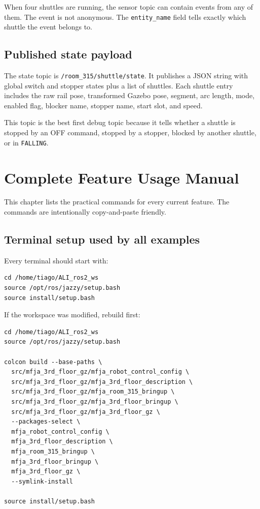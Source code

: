 \documentclass[12pt,a4paper]{report}
\newcommand{\codenext}[1]{\par\Needspace{#1\baselineskip}}
\begin{document}
When four shuttles are running, the sensor topic can contain events from any of
them. The event is not anonymous. The \texttt{entity\_name} field tells exactly
which shuttle the event belongs to.

\section{Published state payload}

The state topic is \texttt{/room\_315/shuttle/state}. It publishes a JSON string
with global switch and stopper states plus a list of shuttles. Each shuttle
entry includes the raw rail pose, transformed Gazebo pose, segment, arc length,
mode, enabled flag, blocker name, stopper name, start slot, and speed.

\codenext{28}


This topic is the best first debug topic because it tells whether a shuttle is
stopped by an OFF command, stopped by a stopper, blocked by another shuttle, or
in \texttt{FALLING}.

\chapter{Complete Feature Usage Manual}

This chapter lists the practical commands for every current feature. The
commands are intentionally copy-and-paste friendly.

\section{Terminal setup used by all examples}

Every terminal should start with:

\begin{lstlisting}[style=terminalcode]
cd /home/tiago/ALI_ros2_ws
source /opt/ros/jazzy/setup.bash
source install/setup.bash
\end{lstlisting}

If the workspace was modified, rebuild first:

\begin{lstlisting}[style=terminalcode]
cd /home/tiago/ALI_ros2_ws
source /opt/ros/jazzy/setup.bash

colcon build --base-paths \
  src/mfja_3rd_floor_gz/mfja_robot_control_config \
  src/mfja_3rd_floor_gz/mfja_3rd_floor_description \
  src/mfja_3rd_floor_gz/mfja_room_315_bringup \
  src/mfja_3rd_floor_gz/mfja_3rd_floor_bringup \
  src/mfja_3rd_floor_gz/mfja_3rd_floor_gz \
  --packages-select \
  mfja_robot_control_config \
  mfja_3rd_floor_description \
  mfja_room_315_bringup \
  mfja_3rd_floor_bringup \
  mfja_3rd_floor_gz \
  --symlink-install

source install/setup.bash
\end{lstlisting}
\end{document}
